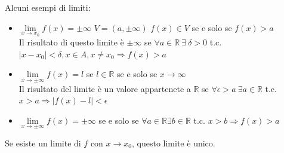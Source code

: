 \begin{example}
Alcuni esempi di limiti:
\begin{itemize}
    \item $\lim\limits_{x\to x_0}f(x) = \pm \infty$ \hspace{.5cm} $V = (a, \pm \infty)$ \hspace{.5cm} $f(x) \in V$ se e solo se $f(x) > a$\\
    Il risultato di questo limite è $\pm \infty$ se $\forall a \in \mathbb{R} \: \exists \: \delta > 0$ t.c. $|x-x_0|<\delta, x \in A, x\neq x_0 \Longrightarrow f(x) > a$
    \item $\lim\limits_{x\to \pm \infty}f(x) = l$ \hspace{.5cm} se $l \in \mathbb{R}$ se e solo se $x \to \infty$\\
    Il risultato del limite è un valore appartenete a $\mathbb{R}$ se $\forall \epsilon > a \: \exists a \in \mathbb{R}$ t.c. $x > a \Longrightarrow |f(x) - l| < \epsilon$
    \item $\lim\limits_{x\to \pm \infty}f(x) = \pm \infty$ \:
    se e solo se $\forall a \in \mathbb{R} \exists b \in \mathbb{R}$ t.c. $x > b \Longrightarrow f(x) > a$
\end{itemize}
\end{example}
\begin{theorem}
Se esiste un limite di $f$ con $x \to x_0$, questo limite è unico.
\end{theorem}


